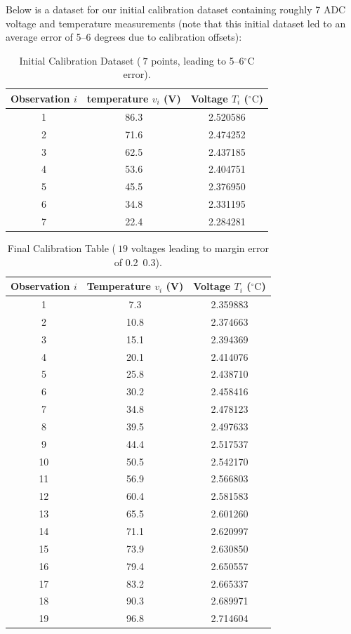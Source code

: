 \documentclass[12pt,a4paper]{article}
\begin{document}
Below is a dataset for our initial calibration dataset containing roughly 7 ADC voltage and temperature measurements (note that this initial dataset led to an average error of 5--6 degrees due to calibration offsets):

\begin{table}[H]
\centering
\begin{tabular}{ccc}
\toprule
Observation \(i\) & temperature \(v_i\) (V) & Voltage \(T_i\) (\(^\circ\mathrm{C}\)) \\
\midrule
1 & 86.3 & 2.520586 \\
2 & 71.6 & 2.474252 \\
3 & 62.5 & 2.437185 \\
4 & 53.6 & 2.404751 \\
5 & 45.5 & 2.376950 \\
6 & 34.8 & 2.331195 \\
7 & 22.4 & 2.284281 \\
\bottomrule
\end{tabular}
\caption{Initial Calibration Dataset   (\(~7\) points, leading to 5--6\(^\circ\mathrm{C}\) error).}
\end{table}

\begin{table}[H]
\centering
\begin{tabular}{ccc}
\toprule
Observation \(i\) & Temperature \(v_i\) (V) & Voltage \(T_i\) (\(^\circ\mathrm{C}\)) \\
\midrule
1 & 7.3  & 2.359883 \\
2 & 10.8 & 2.374663 \\
3 & 15.1 & 2.394369 \\
4 & 20.1 & 2.414076 \\ 
5 & 25.8 & 2.438710 \\ 
6 & 30.2 & 2.458416 \\ 
7 & 34.8 & 2.478123 \\
8 & 39.5 & 2.497633 \\
9 & 44.4 & 2.517537 \\
10 & 50.5 & 2.542170 \\
11 & 56.9 & 2.566803 \\
12 & 60.4 & 2.581583 \\
13 & 65.5 & 2.601260 \\
14 & 71.1 & 2.620997 \\
15 & 73.9 & 2.630850 \\ 
16 & 79.4 & 2.650557 \\
17 & 83.2 & 2.665337 \\ 
18 & 90.3 & 2.689971 \\ 
19 & 96.8 & 2.714604 \\
\bottomrule
\end{tabular}
\caption{Final Calibration Table   (\(~19\) voltages leading to margin error of 0.2~0.3).}
\end{table}
\end{document}

